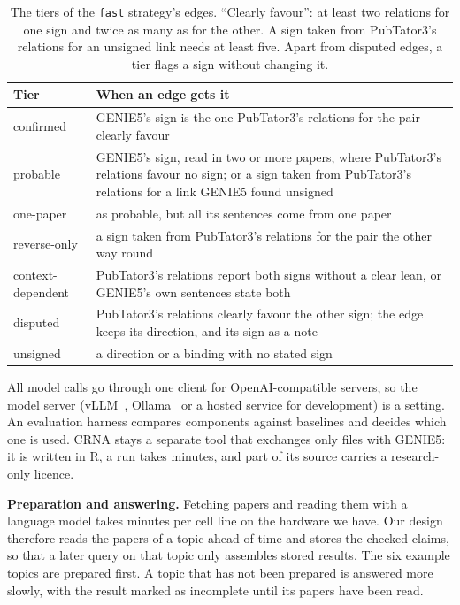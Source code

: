\documentclass[11pt,a4paper]{article}
\newcommand{\gen}{GENIE5}
\newcommand{\code}[1]{\texttt{#1}}
\begin{document}
\begin{table}[htbp]
\centering
\small
\begin{tabularx}{\textwidth}{@{}lL@{}}
\toprule
\textbf{Tier} & \textbf{When an edge gets it}\\
\midrule
confirmed & \gen{}'s sign is the one PubTator3's relations for the pair clearly favour\\
probable & \gen{}'s sign, read in two or more papers, where PubTator3's relations favour no sign;
  or a sign taken from PubTator3's relations for a link \gen{} found unsigned\\
one-paper & as probable, but all its sentences come from one paper\\
reverse-only & a sign taken from PubTator3's relations for the pair the other way round\\
context-dependent & PubTator3's relations report both signs without a clear lean, or \gen{}'s own
  sentences state both\\
disputed & PubTator3's relations clearly favour the other sign; the edge keeps its direction, and
  its sign as a note\\
unsigned & a direction or a binding with no stated sign\\
\bottomrule
\end{tabularx}
\caption{The tiers of the \code{fast} strategy's edges. ``Clearly favour'': at least two relations
for one sign and twice as many as for the other. A sign taken from PubTator3's relations for an
unsigned link needs at least five. Apart from disputed edges, a tier flags a sign without
changing it.}
\label{tab:tierdefs}
\end{table}

All model calls go through one client for OpenAI-compatible servers, so the model
server (vLLM~\cite{vllm}, Ollama~\cite{ollama} or a hosted service for development) is a
setting. An evaluation harness compares components against baselines and decides which one is
used. CRNA stays a separate tool that exchanges only files with \gen{}: it is
written in R, a run takes minutes, and part of its source carries a research-only licence.

\textbf{Preparation and answering.} Fetching papers and reading them with a language model takes
minutes per cell line on the hardware we have. Our design therefore reads the papers of a topic
ahead of time and stores the checked claims, so that a later query on that topic only assembles
stored results. The six example topics are prepared first. A topic that has not been prepared is
answered more slowly, with the result marked as incomplete until its papers have been read.
\end{document}
